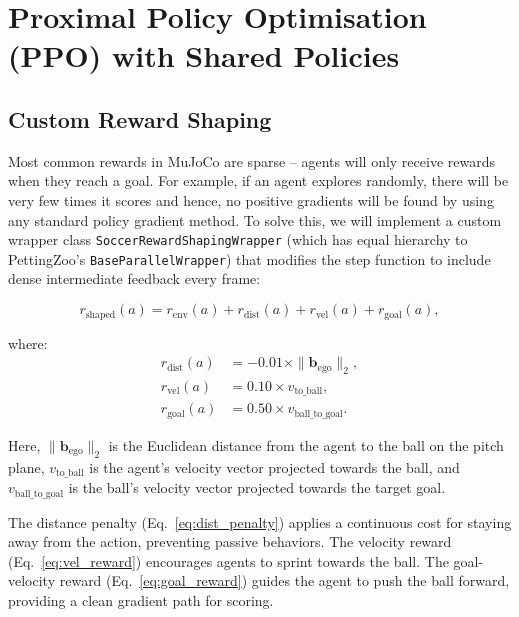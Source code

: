 \section{Proximal Policy Optimisation (PPO) with Shared Policies}
\label{sec:method_ppo}

\subsection{Custom Reward Shaping}
\label{sec:rw_shaping}

Most common rewards in MuJoCo are sparse – agents will only receive rewards when they reach a goal. For example, if an agent explores randomly, there will be very few times it scores and hence, no positive gradients will be found by using any standard policy gradient method. To solve this, we will implement a custom wrapper class \texttt{SoccerRewardShapingWrapper} (which has equal hierarchy to PettingZoo's \texttt{BaseParallelWrapper}) that modifies the step function to include dense intermediate feedback every frame:

\begin{equation}
    r_{\text{shaped}}(a) = r_{\text{env}}(a) + r_{\text{dist}}(a) + r_{\text{vel}}(a) + r_{\text{goal}}(a),
    \label{eq:total_reward}
\end{equation}

where:
\begin{align}
    r_{\text{dist}}(a) &= -0.01 \times \|\mathbf{b}_{\text{ego}}\|_2, \label{eq:dist_penalty} \\
    r_{\text{vel}}(a)  &= 0.10 \times v_{\text{to\_ball}}, \label{eq:vel_reward} \\
    r_{\text{goal}}(a) &= 0.50 \times v_{\text{ball\_to\_goal}}. \label{eq:goal_reward}
\end{align}

Here, $\|\mathbf{b}_{\text{ego}}\|_2$ is the Euclidean distance from the agent to the ball on the pitch plane, $v_{\text{to\_ball}}$ is the agent's velocity vector projected towards the ball, and $v_{\text{ball\_to\_goal}}$ is the ball's velocity vector projected towards the target goal. 

The distance penalty (Eq.~\eqref{eq:dist_penalty}) applies a continuous cost for staying away from the action, preventing passive behaviors. The velocity reward (Eq.~\eqref{eq:vel_reward}) encourages agents to sprint towards the ball. The goal-velocity reward (Eq.~\eqref{eq:goal_reward}) guides the agent to push the ball forward, providing a clean gradient path for scoring.

